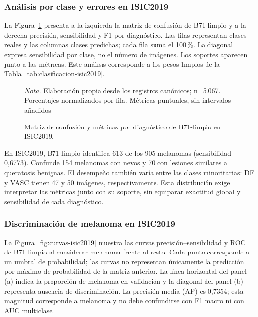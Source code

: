 \subsubsection{Análisis por clase y errores en ISIC2019}
La Figura~\ref{fig:errores-isic2019} presenta a la izquierda la matriz de confusión de B71-limpio y a la derecha precisión, sensibilidad y F1 por diagnóstico. Las filas representan clases reales y las columnas clases predichas; cada fila suma el 100\,\%. La diagonal expresa sensibilidad por clase, no el número de imágenes. Los soportes aparecen junto a las métricas. Este análisis corresponde a los pesos limpios de la Tabla~\ref{tab:clasificacion-isic2019}.

\begin{figure}[!htbp]
\caption{Matriz de confusión y métricas por diagnóstico de B71-limpio en ISIC2019.}\label{fig:errores-isic2019}
\centering

\par\smallskip
{\singlespacing\fontsize{11}{13}\selectfont\raggedright
\noindent\textit{Nota.} Elaboración propia desde los registros canónicos; n=5.067. Porcentajes normalizados por fila. Métricas puntuales, sin intervalos añadidos.\par}
\end{figure}
\FloatBarrier
En ISIC2019, B71-limpio identifica 613 de los 905 melanomas (sensibilidad 0,6773). Confunde 154 melanomas con nevos y 70 con lesiones similares a queratosis benignas. El desempeño también varía entre las clases minoritarias: DF y VASC tienen 47 y 50 imágenes, respectivamente. Esta distribución exige interpretar las métricas junto con su soporte, sin equiparar exactitud global y sensibilidad de cada diagnóstico.

\subsubsection{Discriminación de melanoma en ISIC2019}
La Figura~\ref{fig:curvas-isic2019} muestra las curvas precisión--sensibilidad y ROC de B71-limpio al considerar melanoma frente al resto. Cada punto corresponde a un umbral de probabilidad; las curvas no representan únicamente la predicción por máximo de probabilidad de la matriz anterior. La línea horizontal del panel (a) indica la proporción de melanoma en validación y la diagonal del panel (b) representa ausencia de discriminación. La precisión media (AP) es 0,7354; esta magnitud corresponde a melanoma y no debe confundirse con F1 macro ni con AUC multiclase.

